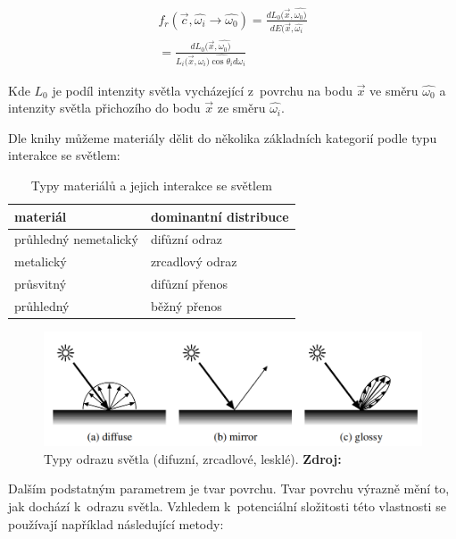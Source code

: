 \begin{equation} \label{eq:brdf}
	\begin{gathered}
		f_r(\vec{c}, \hat{\omega_i} \xrightarrow{} \hat{\omega_0}) = \frac{dL_0(\vec{x}, \hat{\omega_0)}}{dE(\vec{x}, \hat{\omega_i}} \\
		= \frac{dL_0(\vec{x}, \hat{\omega_0)}}{L_i(\vec{x}, \hat{\omega_i)\cos \theta_i d\omega_i}}
	\end{gathered}
\end{equation}

Kde $L_0$ je podíl intenzity světla vycházející z~povrchu na bodu $\vec{x}$ ve směru $\hat{\omega_0}$ a intenzity světla přichozího do bodu $\vec{x}$ ze směru $\hat{\omega_i}$.

Dle knihy \cite{hunter_harold_1987} můžeme materiály dělit do několika základních kategorií podle typu interakce se světlem:

\begin{table}[H]
	\centering
	\begin{tabular}{|l|l|}
		\hline
		materiál              & dominantní distribuce \\ \hline
		průhledný nemetalický & difůzní odraz         \\ \hline
		metalický             & zrcadlový odraz       \\ \hline
		průsvitný             & difůzní přenos        \\ \hline
		průhledný             & běžný přenos          \\ \hline
	\end{tabular}
	\caption{Typy materiálů a jejich interakce se světlem}
\end{table}

\begin{figure}[H]
	\centering
	\includegraphics[scale=1]{obrazky-figures/reflection_types.png}
	\caption{Typy odrazu světla (difuzní, zrcadlové, lesklé). \textbf{Zdroj: \cite{materials}}}
	\label{fig:3d_grid}
\end{figure}

Dalším podstatným parametrem je tvar povrchu. Tvar povrchu výrazně mění to, jak dochází k~odrazu světla. Vzhledem k~potenciální složitosti této vlastnosti se používají například následující metody:

